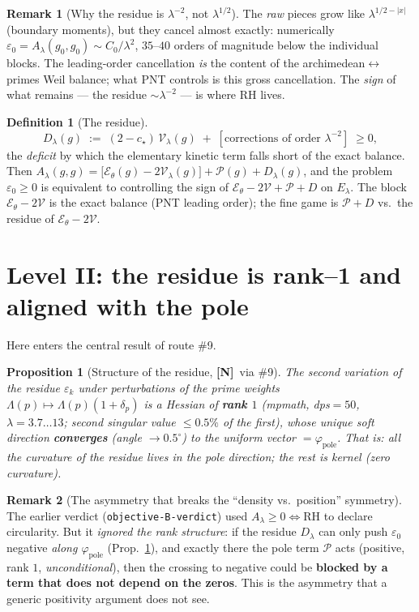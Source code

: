 \documentclass[11pt]{article}
\newcommand{\NM}{\textcolor{blue!70!black}{\textbf{[N]}}}
\theoremstyle{plain}
\newtheorem{proposition}{Proposition}
\theoremstyle{definition}
\newtheorem{remark}{Remark}
\newtheorem{definition}{Definition}
\newcommand{\Lam}{\Lambda}
\newcommand{\El}{E_\lambda}
\newcommand{\kin}{\mathcal E_\theta}
\newcommand{\pole}{\mathcal P}
\newcommand{\vv}{\mathcal V}
\begin{document}
\begin{remark}[Why the residue is $\lambda^{-2}$, not $\lambda^{1/2}$]
The \emph{raw} pieces grow like $\lambda^{1/2-|x|}$ (boundary moments), but they
cancel almost exactly: numerically $\varepsilon_0=A_\lambda(g_0,g_0)\sim
C_0/\lambda^2$, $35$--$40$ orders of magnitude below the individual blocks. The
leading-order cancellation \emph{is} the content of the archimedean$\leftrightarrow$primes
Weil balance; what PNT controls is this gross cancellation.
The \emph{sign} of what remains --- the residue $\sim\lambda^{-2}$ --- is where RH lives.
\end{remark}

\begin{definition}[The residue]
\[
  D_\lambda(g)\;:=\;(2-c_\star)\,\vv_\lambda(g)\;+\;[\text{corrections of order }\lambda^{-2}]
  \;\ge0,
\]
the \emph{deficit} by which the elementary kinetic term falls short of the exact balance.
Then $A_\lambda(g,g)=\bigl[\kin(g)-2\vv_\lambda(g)\bigr]+\pole(g)+D_\lambda(g)$,
and the problem $\varepsilon_0\ge0$ is equivalent to controlling the sign of
$\kin-2\vv+\pole+D$ on $\El$. The block $\kin-2\vv$ is the exact balance (PNT
leading order); the fine game is $\pole+D$ vs.\ the residue of $\kin-2\vv$.
\end{definition}

\section{Level II: the residue is rank--1 and aligned with the pole}\label{sec:residue}

Here enters the central result of route \#9.

\begin{proposition}[Structure of the residue, \NM\ via \#9]\label{prop:rank1}
The second variation of the residue $\varepsilon_k$ under perturbations of the prime
weights $\Lam(p)\mapsto\Lam(p)(1+\delta_p)$ is a Hessian of \textbf{rank $1$}
(mpmath, dps$=50$, $\lambda=3.7\ldots13$; second singular value $\le0.5\%$ of the first),
whose unique soft direction \textbf{converges} (angle $\to0.5^\circ$) to the uniform
vector $=\varphi_{\mathrm{pole}}$. That is: \emph{all the curvature of the residue
lives in the pole direction; the rest is kernel (zero curvature).}
\end{proposition}

\begin{remark}[The asymmetry that breaks the ``density vs.\ position'' symmetry]
The earlier verdict (\texttt{objective-B-verdict}) used $A_\lambda\ge0\Leftrightarrow$RH
to declare circularity. But it \emph{ignored the rank structure}: if the residue
$D_\lambda$ can only push $\varepsilon_0$ negative \emph{along
$\varphi_{\mathrm{pole}}$} (Prop.\ \ref{prop:rank1}), and exactly there the
pole term $\pole$ acts (positive, rank $1$, \emph{unconditional}), then the crossing to
negative could be \textbf{blocked by a term that does not depend on the zeros}.
This is the asymmetry that a generic positivity argument does not see.
\end{remark}
\end{document}
